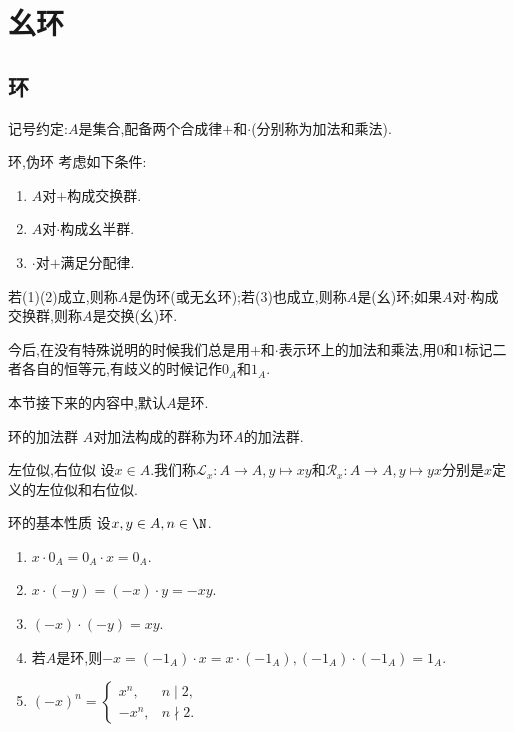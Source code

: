 \chapter{幺环}

\section{环}

记号约定:$A$是集合,配备两个合成律$+$和$\cdot$(分别称为加法和乘法).

\begin{definition}{环,伪环}{}
	考虑如下条件:
	\begin{enumerate}
		\item $A$对$+$构成交换群.
		\item $A$对$\cdot$构成幺半群.
		\item $\cdot$对$+$满足分配律.
	\end{enumerate}
	若(1)(2)成立,则称$A$是伪环(或无幺环);若(3)也成立,则称$A$是(幺)环;如果$A$对$\cdot$构成交换群,则称$A$是交换(幺)环.
\end{definition}

\begin{convention}{}{}
	今后,在没有特殊说明的时候我们总是用$+$和$\cdot$表示环上的加法和乘法,用$0$和$1$标记二者各自的恒等元,有歧义的时候记作$0_{A}$和$1_{A}$.
\end{convention}

本节接下来的内容中,默认$A$是环.

\begin{definition}{环的加法群}{}
	$A$对加法构成的群称为环$A$的加法群.
\end{definition}

\begin{definition}{左位似,右位似}{}
	设$x\in A$.我们称$\mathcal{L}_{x}:A\to A,y\mapsto xy$和$\mathcal{R}_{x}:A\to A,y\mapsto yx$分别是$x$定义的左位似和右位似.
\end{definition}

\begin{proposition}{环的基本性质}{}
	设$x,y\in A,n\in\N$.
	\begin{enumerate}
		\item $x\cdot 0_{A}=0_{A}\cdot x=0_{A}$.
		\item $x\cdot\left(-y\right)=\left(-x\right)\cdot y=-xy$.
		\item $\left(-x\right)\cdot\left(-y\right)=xy$.
		\item 若$A$是环,则$-x=\left(-1_{A}\right)\cdot x=x\cdot\left(-1_{A}\right),\left(-1_{A}\right)\cdot\left(-1_{A}\right)=1_{A}$.
		\item $\left(-x\right)^{n}=
		\begin{cases}
			x^{n},&n\mid 2,\\
			-x^{n},&n\nmid 2.
		\end{cases}
		$
	\end{enumerate}
\end{proposition}

